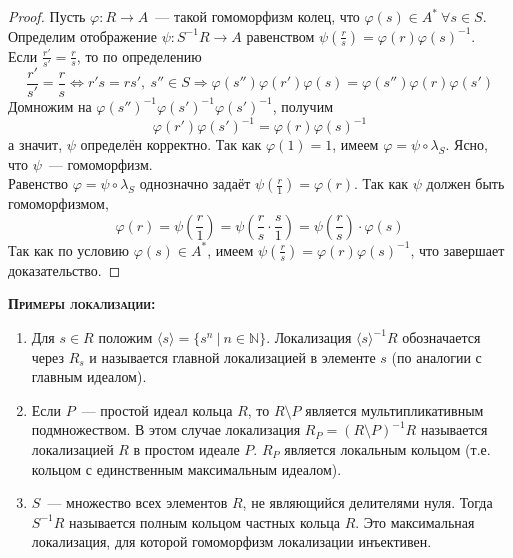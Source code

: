 \documentclass[11pt]{report}
\begin{document}
\begin{proof}
        Пусть $\varphi\colon R \to A$~--- такой гомоморфизм колец, что $\varphi(s) \in A^* \ \forall s \in S$.
        Определим отображение $\psi\colon S^{-1}R \to A$ равенством $\psi(\frac{r}{s}) = \varphi(r) \varphi(s)^{-1}$. \\

        Если $\frac{r'}{s'} = \frac{r}{s}$, то по определению
        \[ \frac{r'}{s'} = \frac{r}{s} \Leftrightarrow r' s = r s', \ s'' \in S \Rightarrow \varphi(s'')\varphi(r')\varphi(s) = \varphi(s'') \varphi(r) \varphi(s') \]
        Домножим на $\varphi(s'')^{-1} \varphi(s')^{-1} \varphi(s')^{-1}$, получим
        \[ \varphi(r') \varphi(s')^{-1} = \varphi(r) \varphi(s)^{-1} \]
        а значит, $\psi$ определён корректно. Так как $\varphi(1) = 1$, имеем $\varphi = \psi \circ \lambda_{S}$. Ясно, что $\psi$~--- гомоморфизм. \\

        Равенство $\varphi = \psi \circ \lambda_{S}$ однозначно задаёт $\psi(\frac{r}{1}) = \varphi(r)$. Так как $\psi$ должен
        быть гомоморфизмом,
        \[ \varphi(r) = \psi(\frac{r}{1}) = \psi(\frac{r}{s} \cdot \frac{s}{1}) = \psi(\frac{r}{s}) \cdot \varphi(s) \]
        Так как по условию $\varphi(s) \in A^*$, имеем $\psi(\frac{r}{s}) = \varphi(r)\varphi(s)^{-1}$, что завершает доказательство.


    \end{proof}

    \textsc{\textbf{Примеры локализации:}}
    \begin{enumerate}
        \item Для $s \in R$ положим $\langle s \rangle = \{ s^n \ | \ n \in \mathbb{N} \}$. Локализация $\langle s \rangle^{-1}R$
              обозначается через $R_s$ и называется главной локализацией в элементе $s$ (по аналогии с главным идеалом).
        \item Если $P$~--- простой идеал кольца $R$, то $R \setminus P$ является мультипликативным подмножеством.
              В этом случае локализация $R_{P} = (R \setminus P)^{-1} R$ называется локализацией $R$ в простом идеале $P$.
              $R_P$ является локальным кольцом (т.е. кольцом с единственным максимальным идеалом).
        \item $S$~--- множество всех элементов $R$, не являющийся делителями нуля. Тогда $S^{-1}R$ называется полным кольцом частных
              кольца $R$. Это максимальная локализация, для которой гомоморфизм локализации инъективен.
    \end{enumerate}
\end{document}
